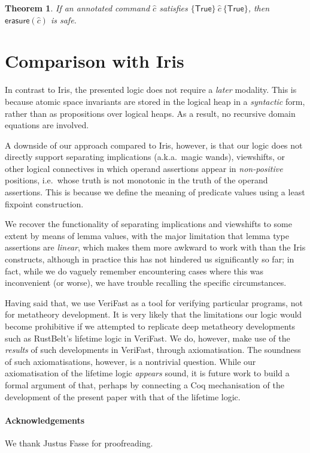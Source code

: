 \documentclass{article}
\newtheorem{theorem}{Theorem}
\begin{document}
\begin{theorem}
If an annotated command $\hat{c}$ satisfies $\{\mathsf{True}\}\ \hat{c}\ \{\mathsf{True}\}$, then $\mathsf{erasure}(\hat{c})$ is safe.
\end{theorem}

\section{Comparison with Iris}

In contrast to Iris, the presented logic does not require a \emph{later} modality. This is because atomic space invariants are stored in the logical heap in a \emph{syntactic} form, rather than as propositions over logical heaps. As a result, no recursive domain equations are involved.

A downside of our approach compared to Iris, however, is that our logic does not directly support separating implications (a.k.a.~magic wands), viewshifts, or other logical connectives in which operand assertions appear in \emph{non-positive} positions, i.e.~whose truth is not monotonic in the truth of the operand assertions. This is because we define the meaning of predicate values using a least fixpoint construction.

We recover the functionality of separating implications and viewshifts to some extent by means of lemma values, with the major limitation that lemma type assertions are \emph{linear}, which makes them more awkward to work with than the Iris constructs, although in practice this has not hindered us significantly so far; in fact, while we do vaguely remember encountering cases where this was inconvenient (or worse), we have trouble recalling the specific circumstances.

Having said that, we use VeriFast as a tool for verifying particular programs, not for metatheory development. It is very likely that the limitations our logic would become prohibitive if we attempted to replicate deep metatheory developments such as RustBelt's lifetime logic \cite{rustbelt} in VeriFast. We do, however, make use of the \emph{results} of such developments in VeriFast, through axiomatisation. The soundness of such axiomatisations, however, is a nontrivial question. While our axiomatisation of the lifetime logic \emph{appears} sound, it is future work to build a formal argument of that, perhaps by connecting a Coq mechanisation of the development of the present paper with that of the lifetime logic.

\paragraph{Acknowledgements} We thank Justus Fasse for proofreading.



\end{document}
